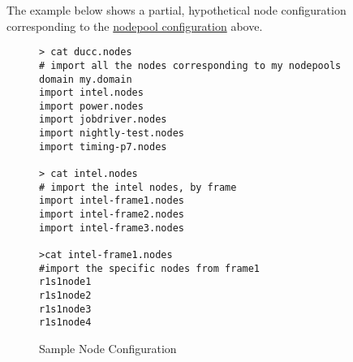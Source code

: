     The example below shows a partial, hypothetical node configuration corresponding to the
    \hyperref[fig:nodepool.configuration]{nodepool configuration} above.

    \begin{figure}[H]

\begin{verbatim}
> cat ducc.nodes
# import all the nodes corresponding to my nodepools 
domain my.domain
import intel.nodes
import power.nodes
import jobdriver.nodes
import nightly-test.nodes
import timing-p7.nodes

> cat intel.nodes
# import the intel nodes, by frame
import intel-frame1.nodes
import intel-frame2.nodes
import intel-frame3.nodes

>cat intel-frame1.nodes
#import the specific nodes from frame1
r1s1node1
r1s1node2
r1s1node3
r1s1node4
\end{verbatim}
      \caption{Sample Node Configuration}
      \label{fig:node.configuration}

    \end{figure}    
    
